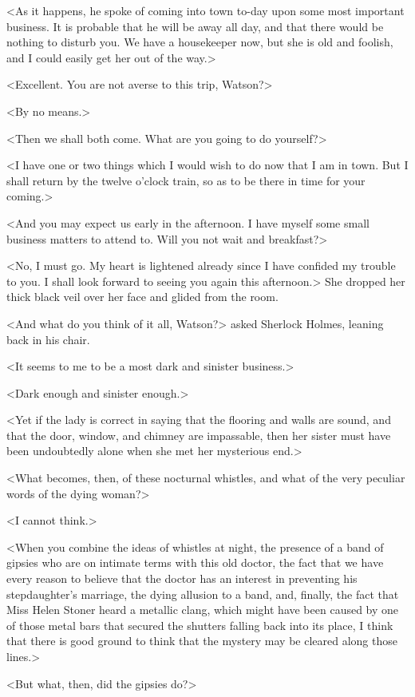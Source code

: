 <As it happens, he spoke of coming into town to-day upon some most important business. It is probable that he will be away all day, and that there would be nothing to disturb you. We have a housekeeper now, but she is old and foolish, and I could easily get her out of the way.>

<Excellent. You are not averse to this trip, Watson?>

<By no means.>

<Then we shall both come. What are you going to do yourself?>

<I have one or two things which I would wish to do now that I am in town. But I shall return by the twelve o'clock train, so as to be there in time for your coming.>

<And you may expect us early in the afternoon. I have myself some small business matters to attend to. Will you not wait and breakfast?>

<No, I must go. My heart is lightened already since I have confided my trouble to you. I shall look forward to seeing you again this afternoon.> She dropped her thick black veil over her face and glided from the room.

<And what do you think of it all, Watson?> asked Sherlock Holmes, leaning back in his chair.

<It seems to me to be a most dark and sinister business.>

<Dark enough and sinister enough.>

<Yet if the lady is correct in saying that the flooring and walls are sound, and that the door, window, and chimney are impassable, then her sister must have been undoubtedly alone when she met her mysterious end.>

<What becomes, then, of these nocturnal whistles, and what of the very peculiar words of the dying woman?>

<I cannot think.>

<When you combine the ideas of whistles at night, the presence of a band of gipsies who are on intimate terms with this old doctor, the fact that we have every reason to believe that the doctor has an interest in preventing his stepdaughter's marriage, the dying allusion to a band, and, finally, the fact that Miss Helen Stoner heard a metallic clang, which might have been caused by one of those metal bars that secured the shutters falling back into its place, I think that there is good ground to think that the mystery may be cleared along those lines.>

<But what, then, did the gipsies do?>


